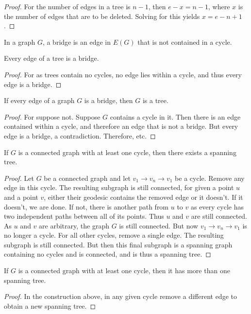 \documentclass[crop=false,class=book]{standalone}
\begin{document}
\begin{proof}
For the number of edges in a tree is $n-1$, then $e-x = n-1$, where $x$ is the number of edges that are to be deleted. Solving for this yields $x=e-n+1$.
\end{proof}
\begin{definition}
In a graph $G$, a bridge is an edge in $E(G)$ that is not contained in a cycle.
\end{definition}
\begin{corollary}
Every edge of a tree is a bridge.
\end{corollary}
\begin{proof}
For as trees contain no cycles, no edge lies within a cycle, and thus every edge is a bridge.
\end{proof}
\begin{corollary}
If every edge of a graph $G$ is a bridge, then $G$ is a tree.
\end{corollary}
\begin{proof}
For suppose not. Suppose $G$ contains a cycle in it. Then there is an edge contained within a cycle, and therefore an edge that is not a bridge. But every edge is a bridge, a contradiction. Therefore, etc.
\end{proof}
\begin{theorem}
If $G$ is a connected graph with at least one cycle, then there exists a spanning tree.
\end{theorem}
\begin{proof}
Let $G$ be a connected graph and let $v_1 \rightarrow v_n\rightarrow v_1$ be a cycle. Remove any edge in this cycle. The resulting subgraph is still connected, for given a point $u$ and a point $v$, either their geodesic contains the removed edge or it doesn't. If it doesn't, we are done. If not, there is another path from $u$ to $v$ as every cycle has two independent paths between all of its points. Thus $u$ and $v$ are still connected. As $u$ and $v$ are arbitrary, the graph $G$ is still connected. But now $v_1\rightarrow v_n \rightarrow v_1$ is no longer a cycle. For all other cycles, remove a single edge. The resulting subgraph is still connected. But then this final subgraph is a spanning graph containing no cycles and is connected, and is thus a spanning tree.
\end{proof}
\begin{corollary}
If $G$ is a connected graph with at least one cycle, then it has more than one spanning tree.
\end{corollary}
\begin{proof}
In the construction above, in any given cycle remove a different edge to obtain a new spanning tree.
\end{proof}
\end{document}

